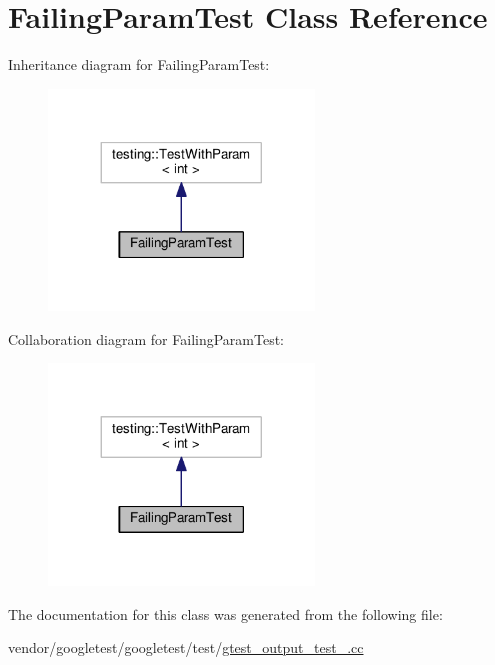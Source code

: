 \hypertarget{classFailingParamTest}{}\section{Failing\+Param\+Test Class Reference}
\label{classFailingParamTest}


Inheritance diagram for Failing\+Param\+Test\+:\nopagebreak
\begin{figure}[H]
\begin{center}
\leavevmode
\includegraphics[width=200pt]{classFailingParamTest__inherit__graph}
\end{center}
\end{figure}


Collaboration diagram for Failing\+Param\+Test\+:\nopagebreak
\begin{figure}[H]
\begin{center}
\leavevmode
\includegraphics[width=200pt]{classFailingParamTest__coll__graph}
\end{center}
\end{figure}


The documentation for this class was generated from the following file\+:\begin{DoxyCompactItemize}
\item 
vendor/googletest/googletest/test/\hyperlink{gtest__output__test___8cc}{gtest\+\_\+output\+\_\+test\+\_\+.\+cc}\end{DoxyCompactItemize}
